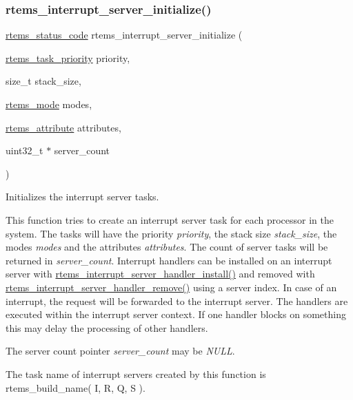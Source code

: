 \subsubsection{\texorpdfstring{rtems\_interrupt\_server\_initialize()}{rtems\_interrupt\_server\_initialize()}}
{\footnotesize\ttfamily \mbox{\hyperlink{group__ClassicStatus_ga545d41846817eaba6143d52ee4d9e9fe}{rtems\+\_\+status\+\_\+code}} rtems\+\_\+interrupt\+\_\+server\+\_\+initialize (\begin{DoxyParamCaption}\item[{\mbox{\hyperlink{group__ClassicTasks_gaa80a0c0938307d1e99d0eb5fee765b47}{rtems\+\_\+task\+\_\+priority}}}]{priority,  }\item[{size\+\_\+t}]{stack\+\_\+size,  }\item[{\mbox{\hyperlink{group__ClassicModes_ga8d46a41a837840dc97336fdcd20e4f68}{rtems\+\_\+mode}}}]{modes,  }\item[{\mbox{\hyperlink{group__ClassicAttributes_gaea40313cf78ed843e09c4315d0a10f79}{rtems\+\_\+attribute}}}]{attributes,  }\item[{uint32\+\_\+t $\ast$}]{server\+\_\+count }\end{DoxyParamCaption})}



Initializes the interrupt server tasks. 

This function tries to create an interrupt server task for each processor in the system. The tasks will have the priority {\itshape priority}, the stack size {\itshape stack\+\_\+size}, the modes {\itshape modes} and the attributes {\itshape attributes}. The count of server tasks will be returned in {\itshape server\+\_\+count}. Interrupt handlers can be installed on an interrupt server with \mbox{\hyperlink{group__rtems__interrupt__extension_ga591084dbfb85313364d6591fef1768bc}{rtems\+\_\+interrupt\+\_\+server\+\_\+handler\+\_\+install()}} and removed with \mbox{\hyperlink{group__rtems__interrupt__extension_gad7840f288b1572dbcbe871b380e4eca7}{rtems\+\_\+interrupt\+\_\+server\+\_\+handler\+\_\+remove()}} using a server index. In case of an interrupt, the request will be forwarded to the interrupt server. The handlers are executed within the interrupt server context. If one handler blocks on something this may delay the processing of other handlers.

The server count pointer {\itshape server\+\_\+count} may be {\itshape N\+U\+LL}.

The task name of interrupt servers created by this function is rtems\+\_\+build\+\_\+name( \textquotesingle{}I\textquotesingle{}, \textquotesingle{}R\textquotesingle{}, \textquotesingle{}Q\textquotesingle{}, \textquotesingle{}S\textquotesingle{} ).

